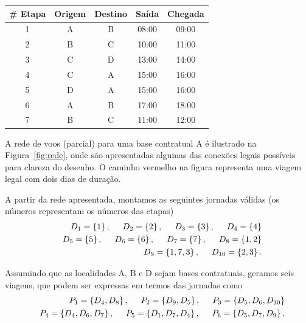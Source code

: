 \documentclass[12pt,a4paper]{article}
\newcommand{\hsp}{\hspace{0.5cm}}                            %
\newcommand{\ev}{\, ,}                                       %
\newcommand{\ep}{\, .}                                       %
\begin{document}
\begin{table}[ht]
	\begin{center}
		\begin{tabular}{ccccc}
			{\bf \# Etapa} & {\bf Origem} & {\bf Destino} & {\bf Saída} & {\bf Chegada} \\ \hline
			1 & A & B & 08:00 & 09:00 \\
			2 & B & C & 10:00 & 11:00 \\
			3 & C & D & 13:00 & 14:00 \\
			4 & C & A & 15:00 & 16:00 \\
			5 & D & A & 15:00 & 16:00 \\
			6 & A & B & 17:00 & 18:00 \\
			7 & B & C & 11:00 & 12:00 \\
		\end{tabular}
	\end{center}
\end{table}

A rede de voos (parcial) para uma base contratual A é ilustrado na Figura~\ref{fig:rede}, onde são
apresentadas algumas das conexões legais possíveis para clareza do desenho. O caminho vermelho
na figura representa uma viagem legal com dois dias de duração. 

A partir da rede apresentada, montamos as seguintes jornadas válidas (os números representam os
números das etapas)
%
\begin{eqnarray*}
	&& D_1 = \{1\} \ev \hsp D_2 = \{2\} \ev \hsp D_3 = \{3\} \ev \hsp D_4 = \{4\} \\
	&& D_5 = \{5\} \ev \hsp D_6 = \{6\} \ev \hsp D_7 = \{7\} \ev \hsp D_8 = \{1, 2\} \\
	&& D_9 = \{1, 7 ,3\} \ev \hsp D_{10} = \{2, 3\} \ep 
\end{eqnarray*}

Assumindo que as localidades A, B e D sejam bases contratuais, geramos seis viagens, que podem ser
expressas em termos das jornadas como 
%
\begin{eqnarray*}
	&& P_1 = \{D_4, D_8\} \ev \hsp P_2 = \{D_9, D_5\} \ev \hsp P_3 = \{D_5, D_6, D_{10}\} \\
	&& P_4 = \{D_4, D_6, D_7\} \ev \hsp P_5 = \{D_1, D_7, D_4\} \ev \hsp P_6 = \{D_5, D_7, D_9\} \ep 
\end{eqnarray*}
\end{document}
